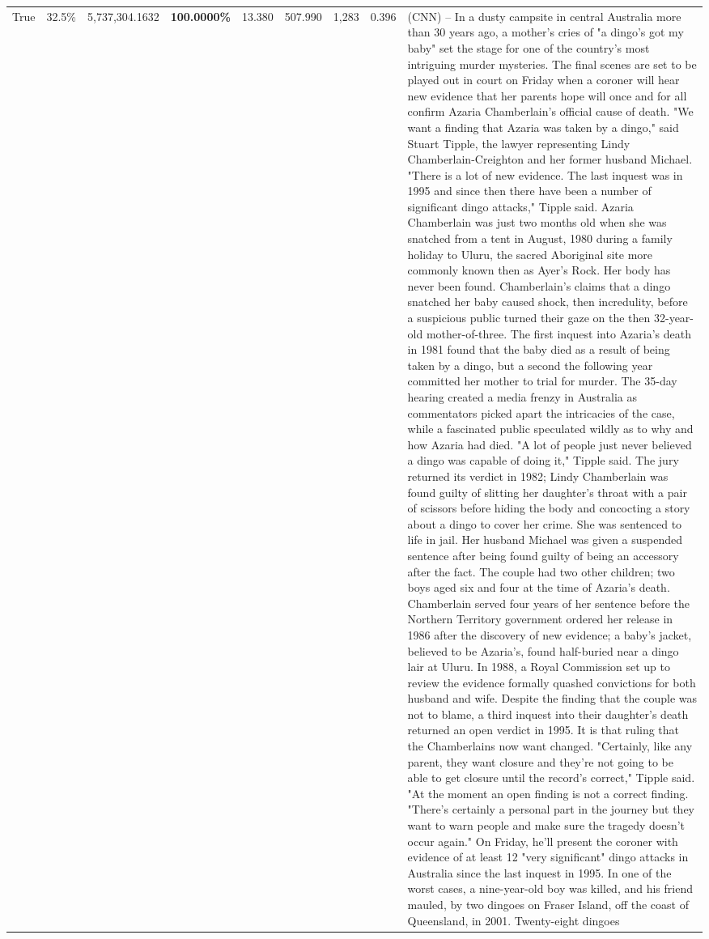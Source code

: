 \begin{table}[H]
\begin{tabular}{lllrlllll}
True & 32.5\% & 5,737,304.1632 & \bfseries \color{red} 100.0000\% & 13.380 & 507.990 & 1,283 & 0.396 & (CNN) -- In a dusty campsite in central Australia more than 30 years ago, a mother's cries of "a dingo's got my baby" set the stage for one of the country's most intriguing murder mysteries. The final scenes are set to be played out in court on Friday when a coroner will hear new evidence that her parents hope will once and for all confirm Azaria Chamberlain's official cause of death. "We want a finding that Azaria was taken by a dingo," said Stuart Tipple, the lawyer representing Lindy Chamberlain-Creighton and her former husband Michael. "There is a lot of new evidence. The last inquest was in 1995 and since then there have been a number of significant dingo attacks," Tipple said. Azaria Chamberlain was just two months old when she was snatched from a tent in August, 1980 during a family holiday to Uluru, the sacred Aboriginal site more commonly known then as Ayer's Rock. Her body has never been found. Chamberlain's claims that a dingo snatched her baby caused shock, then incredulity, before a suspicious public turned their gaze on the then 32-year-old mother-of-three. The first inquest into Azaria's death in 1981 found that the baby died as a result of being taken by a dingo, but a second the following year committed her mother to trial for murder. The 35-day hearing created a media frenzy in Australia as commentators picked apart the intricacies of the case, while a fascinated public speculated wildly as to why and how Azaria had died. "A lot of people just never believed a dingo was capable of doing it," Tipple said. The jury returned its verdict in 1982; Lindy Chamberlain was found guilty of slitting her daughter's throat with a pair of scissors before hiding the body and concocting a story about a dingo to cover her crime. She was sentenced to life in jail. Her husband Michael was given a suspended sentence after being found guilty of being an accessory after the fact. The couple had two other children; two boys aged six and four at the time of Azaria's death. Chamberlain served four years of her sentence before the Northern Territory government ordered her release in 1986 after the discovery of new evidence; a baby's jacket, believed to be Azaria's, found half-buried near a dingo lair at Uluru. In 1988, a Royal Commission set up to review the evidence formally quashed convictions for both husband and wife. Despite the finding that the couple was not to blame, a third inquest into their daughter's death returned an open verdict in 1995. It is that ruling that the Chamberlains now want changed. "Certainly, like any parent, they want closure and they're not going to be able to get closure until the record's correct," Tipple said. "At the moment an open finding is not a correct finding. "There's certainly a personal part in the journey but they want to warn people and make sure the tragedy doesn't occur again." On Friday, he'll present the coroner with evidence of at least 12 "very significant" dingo attacks in Australia since the last inquest in 1995. In one of the worst cases, a nine-year-old boy was killed, and his friend mauled, by two dingoes on Fraser Island, off the coast of Queensland, in 2001. Twenty-eight dingoes 
\end{tabular}
\end{table}
